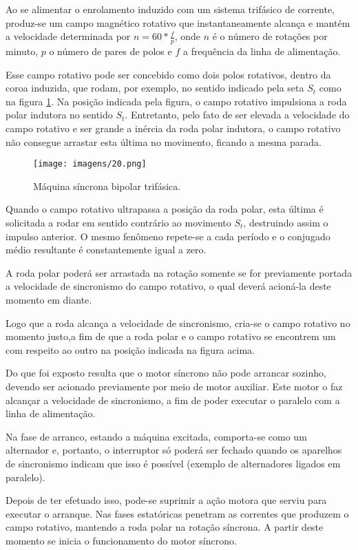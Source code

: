 Ao se alimentar o enrolamento induzido com um sistema trifásico de corrente, produz-se um campo magnético rotativo que instantaneamente alcança e mantém a velocidade determinada por $n = 60* \frac{f}{p}$, onde $n$ é o número de rotações por minuto, $p$ o número de pares de polos e $f$ a frequência da linha de alimentação.

Esse campo rotativo pode ser concebido como dois polos rotativos, dentro da coroa induzida, que rodam, por exemplo, no sentido indicado pela seta $S_t$ como na figura \ref{fig:20}. Na posição indicada pela figura, o campo rotativo impulsiona a roda polar indutora no sentido $S_t$. Entretanto, pelo fato de ser elevada a velocidade do campo rotativo e ser grande a inércia da roda polar indutora, o campo rotativo não consegue arrastar esta última no movimento, ficando a mesma parada.

\begin{figure}[ht!]
\center 
\texttt{[image: imagens/20.png]}
\caption{Máquina síncrona bipolar trifásica.}\label{fig:20}
\end{figure}

Quando o campo rotativo ultrapassa a posição da roda polar, esta última é solicitada a rodar em sentido contrário ao movimento $S_t$, destruindo assim o impulso anterior. O mesmo fenômeno repete-se a cada período e o conjugado médio resultante é constantemente igual a zero.

A roda polar poderá ser arrastada na rotação somente se for previamente portada a velocidade de sincronismo do campo rotativo, o qual deverá acioná-la deste momento em diante.

Logo que a roda alcança a velocidade de sincronismo, cria-se o campo rotativo no momento justo,a fim de que a roda polar e o campo rotativo se encontrem um com respeito ao outro na posição indicada na figura acima.

Do que foi exposto resulta que o motor síncrono não pode arrancar sozinho, devendo ser acionado previamente por meio de motor auxiliar. Este motor o faz alcançar a velocidade de sincronismo, a fim de poder executar o paralelo com a linha de alimentação.

Na fase de arranco, estando a máquina excitada, comporta-se como um alternador e, portanto, o interruptor só poderá ser fechado quando os aparelhos de  sincronismo indicam que isso é possível (exemplo de alternadores ligados em paralelo).

Depois de ter efetuado isso, pode-se suprimir a ação motora que serviu para executar o arranque. Nas fases estatóricas penetram as correntes que produzem o campo rotativo, mantendo a roda polar na rotação síncrona. A partir deste momento se inicia o funcionamento do motor síncrono.

